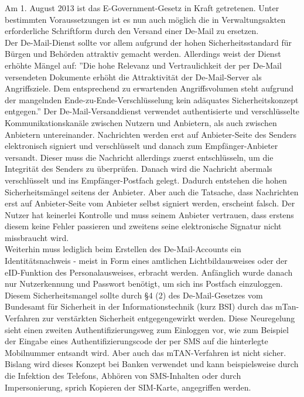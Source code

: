 Am 1. August 2013 ist das E-Government-Gesetz \textcite{bea:e-government} in Kraft getretenen. Unter bestimmten Voraussetzungen ist es nun auch möglich die in Verwaltungsakten erforderliche Schriftform durch den Versand einer De-Mail zu ersetzen. \\
Der De-Mail-Dienst sollte vor allem aufgrund der hohen Sicherheitsstandard für Bürgen und Behörden attraktiv gemacht werden. Allerdings weist der Dienst erhöhte Mängel auf:
''Die hohe Relevanz und Vertraulichkeit der per De-Mail versendeten Dokumente erhöht die Attraktivität der De-Mail-Server als Angriffsziele. Dem entsprechend zu erwartenden Angriffsvolumen steht aufgrund der mangelnden Ende-zu-Ende-Verschlüsselung kein adäquates Sicherheitskonzept entgegen.'' \textcite{bea:demail:ccc} Der De-Mail-Versanddienst verwendet authentisierte und verschlüsselte Kommunikationskanäle zwischen Nutzern und Anbietern, als auch zwischen Anbietern untereinander. Nachrichten werden erst auf Anbieter-Seite des Senders elektronisch signiert und verschlüsselt und danach zum Empfänger-Anbieter versandt. Dieser muss die Nachricht allerdings zuerst entschlüsseln, um die Integrität des Senders zu überprüfen. Danach wird die Nachricht abermals verschlüsselt und ins Empfänger-Postfach gelegt. Dadurch entstehen die hohen Sicherheitsmängel seitens der Anbieter. Aber auch die Tatsache, dass Nachrichten erst auf Anbieter-Seite vom Anbieter selbst signiert werden, erscheint falsch. Der Nutzer hat keinerlei Kontrolle und muss seinem Anbieter vertrauen, dass erstens diesem keine Fehler passieren und zweitens seine elektronische Signatur nicht missbraucht wird. \\
Weiterhin muss lediglich beim Erstellen des De-Mail-Accounts ein Identitätsnachweis - meist in Form eines amtlichen Lichtbildausweises oder der eID-Funktion des Personalausweises, erbracht werden. Anfänglich wurde danach nur Nutzerkennung und Passwort benötigt, um sich ins Postfach einzuloggen. Diesem Sicherheitsmangel sollte durch §4 (2) des De-Mail-Gesetzes vom Bundesamt für Sicherheit in der Informationstechnik (kurz BSI) durch das mTan-Verfahren zur verstärkten Sicherheit entgegengewirkt werden. Diese Neuregelung sieht einen zweiten Authentifizierungsweg zum Einloggen vor, wie zum Beispiel der Eingabe eines Authentifizierungscode der per SMS auf die hinterlegte Mobilnummer entsandt wird. Aber auch das mTAN-Verfahren ist nicht sicher. Bislang wird dieses Konzept bei Banken verwendet und kann beispielsweise durch die Infektion des Telefons, Abhören von SMS-Inhalten oder durch Impersonierung, sprich Kopieren der SIM-Karte, angegriffen werden. \textcite{bea:demail:brokenbydesign} \\
